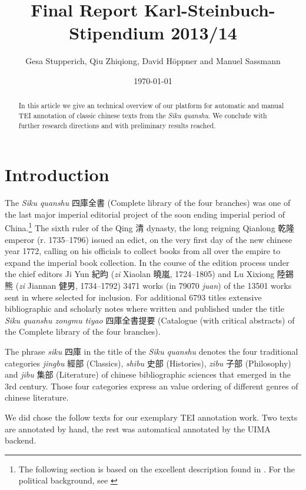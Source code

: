 \documentclass[12pt, draft]{article}
\begin{document}
\title{Final Report Karl-Steinbuch-Stipendium 2013/14}
\author{Gesa Stupperich, Qiu Zhiqiong, David Höppner and Manuel Sassmann}
\date{\today}
\maketitle

\begin{abstract}
In this article we
give an technical overview of
our platform for automatic and manual
TEI annotation of classic chinese texts from the \emph{Siku quanshu}.
We conclude with further research directions and
with preliminary results reached.
\end{abstract}

\section{Introduction}

The \emph{Siku quanshu} 四庫全書 (Complete library of the four branches)
was one of the last major imperial editorial project of the
soon ending imperial period of China.\footnote{The following section is based on the excellent
description found in \cite[945-954]{Wilkinson:2012}. For the political
background, see \cite{Guy:1987}}
The sixth ruler of the Qing 清 dynasty, the long reigning
Qianlong 乾隆 emperor (r. 1735--1796) issued an edict,
on the very first
day of the new chinese year 1772, calling on his officials to collect books from
all over the empire to expand the imperial book collection.
In the course of the edition process under the
chief editors Ji Yun 紀昀 (\emph{zi} Xiaolan 曉嵐, 1724--1805) and Lu Xixiong 陸錫熊
(\emph{zi} Jiannan 健男, 1734--1792) 3471 works (in 79070 \emph{juan})
of the 13501 works sent in where selected for inclusion.
For additional 6793 titles extensive bibliographic and scholarly
notes where written and published under the title \emph{Siku quanshu zongmu tiyao}
四庫全書提要 (Catalogue (with critical abstracts) of the Complete library of the 
four branches).

The phrase \emph{siku} 四庫 in the title of the \emph{Siku quanshu}
denotes the four traditional categories \emph{jingbu} 經部
(Classics), \emph{shibu} 史部 (Histories), \emph{zibu} 子部 (Philosophy)
and \emph{jibu} 集部 (Literature)
of chinese bibliographic sciences that emerged in the 3rd century.
Those four categories express an value ordering of
different genres of chinese literature.

We did chose the follow texts for our exemplary TEI annotation work.
Two texts are annotated by hand, the rest was automatical annotated
by the UIMA backend.
\end{document}
